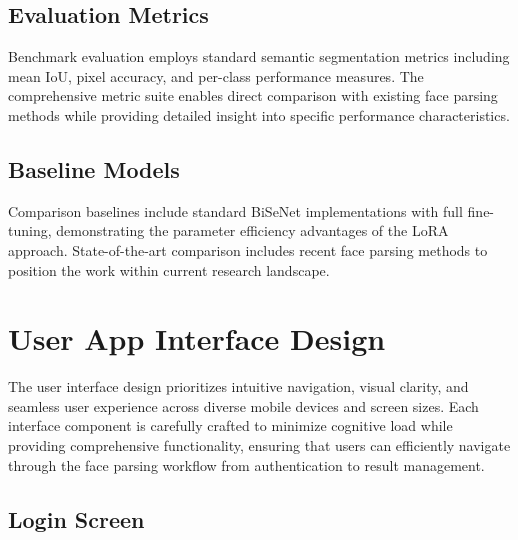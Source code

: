 \documentclass[12pt,a4paper]{report}
\begin{document}
\subsection{Evaluation Metrics}

Benchmark evaluation employs standard semantic segmentation metrics including mean IoU, pixel accuracy, and per-class performance measures. The comprehensive metric suite enables direct comparison with existing face parsing methods while providing detailed insight into specific performance characteristics.

\subsection{Baseline Models}

Comparison baselines include standard BiSeNet
\cite{yu2018bisenet}implementations with full fine-tuning, demonstrating the parameter efficiency advantages of the LoRA\cite{hu2021lora} approach. State-of-the-art comparison includes recent face parsing methods to position the work within current research landscape.

\section{User App Interface Design}

The user interface design prioritizes intuitive navigation, visual clarity, and seamless user experience across diverse mobile devices and screen sizes. Each interface component is carefully crafted to minimize cognitive load while providing comprehensive functionality, ensuring that users can efficiently navigate through the face parsing workflow from authentication to result management.

\subsection{Login Screen}
\end{document}
